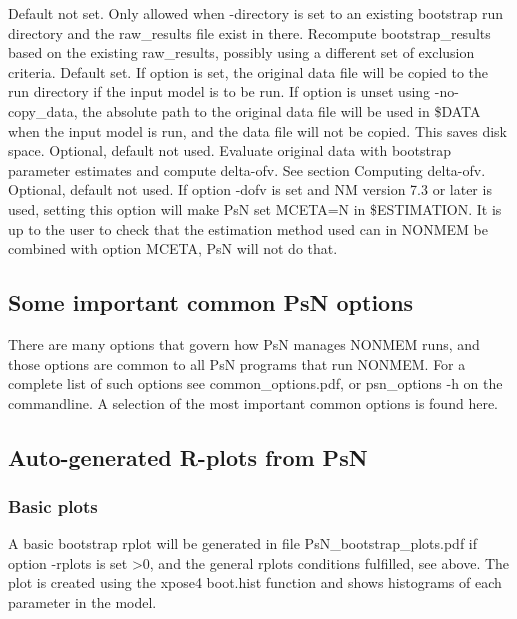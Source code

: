 \begin{optionlist}
\nextopt
{}
Default not set. Only allowed when -directory is set to an existing bootstrap run directory and
the raw\_results file exist in there. Recompute bootstrap\_results based on the existing raw\_results,
possibly using a different set of exclusion criteria.
\nextopt
{}
Default set. If option is set, the original data file
will be copied to the run directory if the input model is to be run.
If option is unset using -no-copy\_data, the absolute path to the original data file will be used in
\$DATA when the input model is run, and the data file will not be copied. This saves disk space.
\nextopt
{}
Optional, default not used. Evaluate original data with bootstrap parameter estimates and compute delta-ofv. See section Computing delta-ofv. 
\nextopt
{}
Optional, default not used. If option -dofv is set and NM version 7.3 or later is used, setting this option will make PsN set MCETA=N in \$ESTIMATION. It is up to the user to check that the estimation method used can in NONMEM be combined with option MCETA, PsN will not do that. 
\nextopt
\end{optionlist}

\subsection{Some important common PsN options}
There are many options that govern how PsN manages NONMEM runs, and
those options are common to all PsN programs that run NONMEM.
For a complete list of such options see common\_options.pdf, 
or psn\_options -h on the commandline. A selection of
the most important common options is found here.


\subsection{Auto-generated R-plots from PsN}
\newcommand{\rplotsconditions}{The default bootstrap template 
requires the xpose4 R library of at least version 4.5.0. 
If the conditions are not fulfilled then no pdf will be generated,
see the .Rout file in the main run directory for error messages.}


\subsubsection*{Basic plots}
A basic bootstrap rplot will be generated in file PsN\_bootstrap\_plots.pdf
if option -rplots is set >0,
and the general rplots conditions fulfilled, see above.
The plot is created using the xpose4 boot.hist function
and shows histograms of each parameter in the model.
